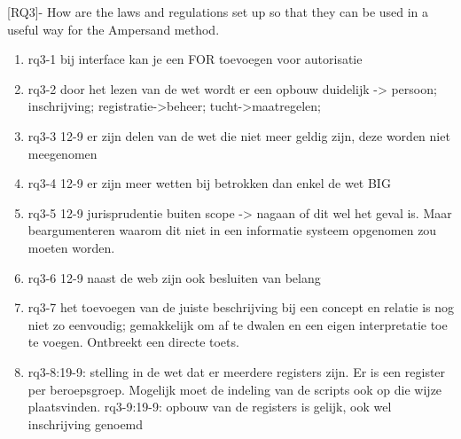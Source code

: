 [RQ3]- How are the laws and regulations set up so that they can be used in a useful way for the Ampersand method.
\begin{enumerate}
    \item rq3-1 bij interface kan je een FOR toevoegen voor autorisatie
    \item rq3-2 door het lezen van de wet wordt er een opbouw duidelijk -> persoon; inschrijving; registratie->beheer; tucht->maatregelen; 
    \item rq3-3 12-9 er zijn delen van de wet die niet meer geldig zijn, deze worden niet meegenomen
    \item rq3-4 12-9 er zijn meer wetten bij betrokken dan enkel de wet BIG
    \item rq3-5 12-9 jurisprudentie buiten scope -> nagaan of dit wel het geval is. Maar beargumenteren waarom dit niet in een informatie systeem opgenomen zou moeten worden.
    \item rq3-6 12-9 naast de web zijn ook besluiten van belang
    \item rq3-7 het toevoegen van de juiste beschrijving bij een concept en relatie is nog niet zo eenvoudig; gemakkelijk om af te dwalen en een eigen interpretatie toe te voegen. Ontbreekt een directe toets.
    \item rq3-8:19-9: stelling in de wet dat er meerdere registers zijn. Er is een register per beroepsgroep. Mogelijk moet de indeling van de scripts ook op die wijze plaatsvinden.
    \itme rq3-9:19-9: opbouw van de registers is gelijk, ook wel inschrijving genoemd
\end{enumerate}